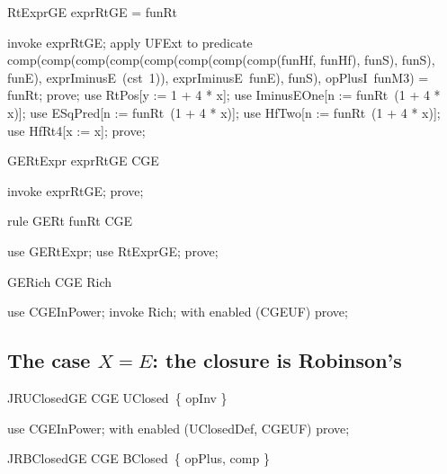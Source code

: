 \documentclass{article}
\begin{document}
\begin{theorem}{RtExprGE}
  exprRtGE = funRt
\end{theorem}

\begin{zproof}
invoke exprRtGE;
apply UFExt to predicate comp(comp(comp(comp(comp(comp(comp(comp(funHf, funHf), funS), funS), funE), exprIminusE~(cst~1)), exprIminusE~funE), funS), opPlusI~funM3) = funRt;
prove;
use RtPos[y := 1 + 4 * x];
use IminusEOne[n := funRt~(1 + 4 * x)];
use ESqPred[n := funRt~(1 + 4 * x)];
use HfTwo[n := funRt~(1 + 4 * x)];
use HfRt4[x := x];
prove;
\end{zproof}

\begin{theorem}{GERtExpr}
  exprRtGE \in CGE
\end{theorem}

\begin{zproof}
invoke exprRtGE;
prove;
\end{zproof}

\begin{theorem}{rule GERt}
  funRt \in CGE
\end{theorem}

\begin{zproof}
use GERtExpr;
use RtExprGE;
prove;
\end{zproof}

\begin{theorem}{GERich}
  CGE \in Rich
\end{theorem}

\begin{zproof}
use CGEInPower;
invoke Rich;
with enabled (CGEUF) prove;
\end{zproof}

\subsection{The case $X = E$: the closure is Robinson's}

\begin{theorem}{JRUClosedGE}
  CGE \in UClosed~\{ opInv \}
\end{theorem}

\begin{zproof}
use CGEInPower;
with enabled (UClosedDef, CGEUF) prove;
\end{zproof}

\begin{theorem}{JRBClosedGE}
  CGE \in BClosed~\{ opPlus, comp \}
\end{theorem}
\end{document}
